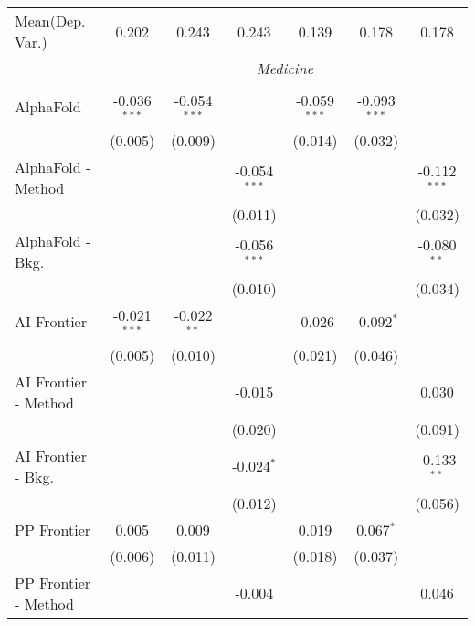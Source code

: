 \begin{tabular}{lcccccc}
Mean(Dep. Var.) & 0.202 & 0.243 & 0.243 & 0.139 & 0.178 & 0.178 \\
 & \multicolumn{6}{c}{\textit{Medicine}} \\ \\
   AlphaFold            & -0.036$^{***}$ & -0.054$^{***}$ &                & -0.059$^{***}$ & -0.093$^{***}$ &   \\   
                        & (0.005)        & (0.009)        &                & (0.014)        & (0.032)        &   \\   
   AlphaFold - Method   &                &                & -0.054$^{***}$ &                &                & -0.112$^{***}$\\   
                        &                &                & (0.011)        &                &                & (0.032)\\   
   AlphaFold - Bkg.     &                &                & -0.056$^{***}$ &                &                & -0.080$^{**}$\\   
                        &                &                & (0.010)        &                &                & (0.034)\\   
   AI Frontier          & -0.021$^{***}$ & -0.022$^{**}$  &                & -0.026         & -0.092$^{*}$   &   \\   
                        & (0.005)        & (0.010)        &                & (0.021)        & (0.046)        &   \\   
   AI Frontier - Method &                &                & -0.015         &                &                & 0.030\\   
                        &                &                & (0.020)        &                &                & (0.091)\\   
   AI Frontier - Bkg.   &                &                & -0.024$^{*}$   &                &                & -0.133$^{**}$\\   
                        &                &                & (0.012)        &                &                & (0.056)\\   
   PP Frontier          & 0.005          & 0.009          &                & 0.019          & 0.067$^{*}$    &   \\   
                        & (0.006)        & (0.011)        &                & (0.018)        & (0.037)        &   \\   
   PP Frontier - Method &                &                & -0.004         &                &                & 0.046\\   

\end{tabular}
